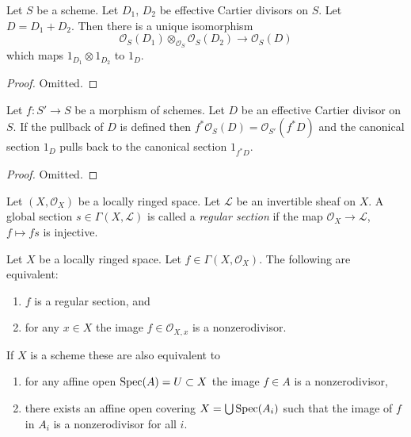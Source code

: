 \begin{lemma}
\label{lemma-invertible-sheaf-sum-effective-Cartier-divisors}
Let $S$ be a scheme.
Let $D_1$, $D_2$ be effective Cartier divisors on $S$.
Let $D = D_1 + D_2$.
Then there is a unique isomorphism
$$
\mathcal{O}_S(D_1) \otimes_{\mathcal{O}_S} \mathcal{O}_S(D_2)
\longrightarrow
\mathcal{O}_S(D)
$$
which maps $1_{D_1} \otimes 1_{D_2}$ to $1_D$.
\end{lemma}

\begin{proof}
Omitted.
\end{proof}

\begin{lemma}
\label{lemma-pullback-effective-Cartier-divisors}
Let $f : S' \to S$ be a morphism of schemes.
Let $D$ be an effective Cartier divisor on $S$.
If the pullback of $D$ is defined then
$f^*\mathcal{O}_S(D) = \mathcal{O}_{S'}(f^*D)$
and the canonical section $1_D$ pulls back to
the canonical section $1_{f^*D}$.
\end{lemma}

\begin{proof}
Omitted.
\end{proof}

\begin{definition}
\label{definition-regular-section}
Let $(X, \mathcal{O}_X)$ be a locally ringed space.
Let $\mathcal{L}$ be an invertible sheaf on $X$.
A global section $s \in \Gamma(X, \mathcal{L})$ is called a
{\it regular section} if the map $\mathcal{O}_X \to \mathcal{L}$,
$f \mapsto fs$ is injective.
\end{definition}

\begin{lemma}
\label{lemma-regular-section-structure-sheaf}
Let $X$ be a locally ringed space. Let $f \in \Gamma(X, \mathcal{O}_X)$.
The following are equivalent:
\begin{enumerate}
\item $f$ is a regular section, and
\item for any $x \in X$ the image $f \in \mathcal{O}_{X, x}$
is a nonzerodivisor.
\end{enumerate}
If $X$ is a scheme these are also equivalent to
\begin{enumerate}
\item[(3)] for any affine open $\mathop{\mathrm{Spec}}(A) = U \subset X$
the image $f \in A$ is a nonzerodivisor,
\item[(4)] there exists an affine open covering
$X = \bigcup \mathop{\mathrm{Spec}}(A_i)$ such that
the image of $f$ in $A_i$ is a nonzerodivisor for all $i$.
\end{enumerate}
\end{lemma}

